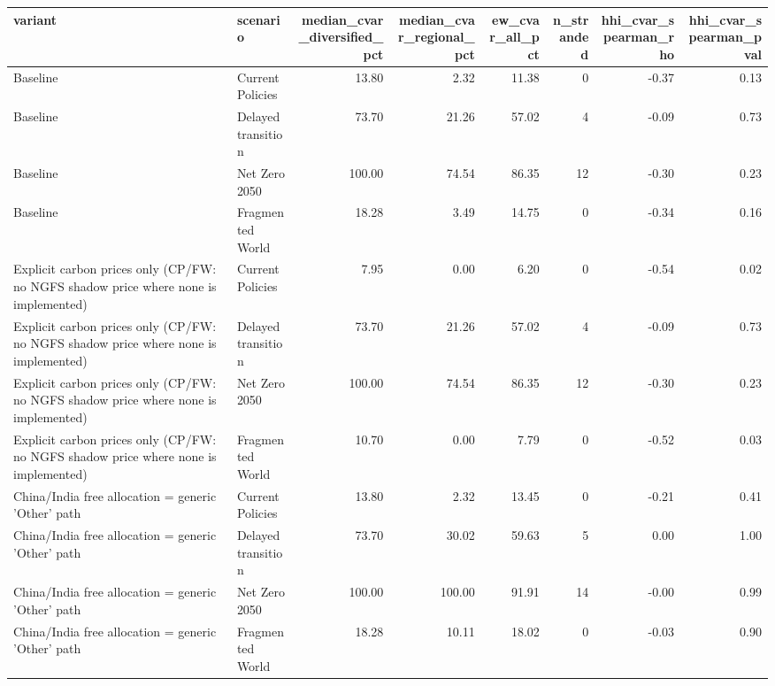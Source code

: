 \begin{tabular}{llrrrrrr}
\toprule
variant & scenario & median_cvar_diversified_pct & median_cvar_regional_pct & ew_cvar_all_pct & n_stranded & hhi_cvar_spearman_rho & hhi_cvar_spearman_pval \\
\midrule
Baseline & Current Policies & 13.80 & 2.32 & 11.38 & 0 & -0.37 & 0.13 \\
Baseline & Delayed transition & 73.70 & 21.26 & 57.02 & 4 & -0.09 & 0.73 \\
Baseline & Net Zero 2050 & 100.00 & 74.54 & 86.35 & 12 & -0.30 & 0.23 \\
Baseline & Fragmented World & 18.28 & 3.49 & 14.75 & 0 & -0.34 & 0.16 \\
Explicit carbon prices only (CP/FW: no NGFS shadow price where none is implemented) & Current Policies & 7.95 & 0.00 & 6.20 & 0 & -0.54 & 0.02 \\
Explicit carbon prices only (CP/FW: no NGFS shadow price where none is implemented) & Delayed transition & 73.70 & 21.26 & 57.02 & 4 & -0.09 & 0.73 \\
Explicit carbon prices only (CP/FW: no NGFS shadow price where none is implemented) & Net Zero 2050 & 100.00 & 74.54 & 86.35 & 12 & -0.30 & 0.23 \\
Explicit carbon prices only (CP/FW: no NGFS shadow price where none is implemented) & Fragmented World & 10.70 & 0.00 & 7.79 & 0 & -0.52 & 0.03 \\
China/India free allocation = generic 'Other' path & Current Policies & 13.80 & 2.32 & 13.45 & 0 & -0.21 & 0.41 \\
China/India free allocation = generic 'Other' path & Delayed transition & 73.70 & 30.02 & 59.63 & 5 & 0.00 & 1.00 \\
China/India free allocation = generic 'Other' path & Net Zero 2050 & 100.00 & 100.00 & 91.91 & 14 & -0.00 & 0.99 \\
China/India free allocation = generic 'Other' path & Fragmented World & 18.28 & 10.11 & 18.02 & 0 & -0.03 & 0.90 \\
\bottomrule
\end{tabular}
